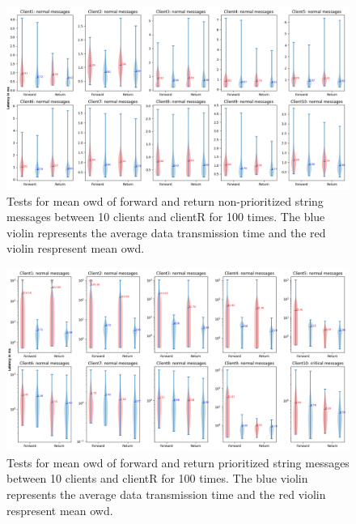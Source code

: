 \begin{figure}
    \centering
    \includegraphics[width=\textheight]{figures/tests/priority_tests/violin_10clients_string_non_priority.png}\hfill 
    \caption{Tests for mean \gls{owd} of forward and return non-prioritized string messages between 10 clients 
    and clientR for 100 times. The blue violin represents the average data transmission time and the red violin 
    respresent mean \gls{owd}.} \label{fig: priority-10clients-a}
\end{figure}
\begin{figure}
    \centering
    \includegraphics[width=\textheight]{figures/tests/priority_tests/log_violin_10clients_string_priority.png}\hfill 
    \caption{Tests for mean \gls{owd} of forward and return prioritized string messages between 10 clients 
    and clientR for 100 times. The blue violin represents the average data transmission time and the red violin 
    respresent mean \gls{owd}.} \label{fig: priority-10clients-b}
\end{figure}





